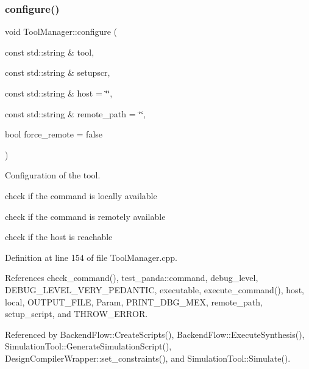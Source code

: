 \subsubsection{\texorpdfstring{configure()}{configure()}}
{\footnotesize\ttfamily void Tool\+Manager\+::configure (\begin{DoxyParamCaption}\item[{const std\+::string \&}]{tool,  }\item[{const std\+::string \&}]{setupscr,  }\item[{const std\+::string \&}]{host = {\ttfamily \char`\"{}\char`\"{}},  }\item[{const std\+::string \&}]{remote\+\_\+path = {\ttfamily \char`\"{}\char`\"{}},  }\item[{bool}]{force\+\_\+remote = {\ttfamily false} }\end{DoxyParamCaption})}



Configuration of the tool. 

check if the command is locally available

check if the command is remotely available

check if the host is reachable 

Definition at line 154 of file Tool\+Manager.\+cpp.



References check\+\_\+command(), test\+\_\+panda\+::command, debug\+\_\+level, D\+E\+B\+U\+G\+\_\+\+L\+E\+V\+E\+L\+\_\+\+V\+E\+R\+Y\+\_\+\+P\+E\+D\+A\+N\+T\+IC, executable, execute\+\_\+command(), host, local, O\+U\+T\+P\+U\+T\+\_\+\+F\+I\+LE, Param, P\+R\+I\+N\+T\+\_\+\+D\+B\+G\+\_\+\+M\+EX, remote\+\_\+path, setup\+\_\+script, and T\+H\+R\+O\+W\+\_\+\+E\+R\+R\+OR.



Referenced by Backend\+Flow\+::\+Create\+Scripts(), Backend\+Flow\+::\+Execute\+Synthesis(), Simulation\+Tool\+::\+Generate\+Simulation\+Script(), Design\+Compiler\+Wrapper\+::set\+\_\+constraints(), and Simulation\+Tool\+::\+Simulate().

